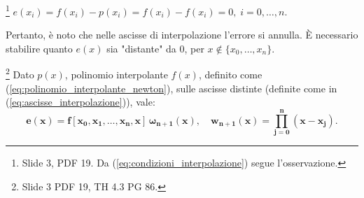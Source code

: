 \begin{remark}
    \footnote{Slide 3, PDF 19. Da (\ref{eq:condizioni_interpolazione}) segue l'osservazione.} $e(x_i)=f(x_i)-p(x_i)=f(x_i)-f(x_i)=0,\; i=0,\hdots,n.$
\end{remark}

Pertanto, è noto che nelle ascisse di interpolazione l'errore si annulla. È necessario stabilire quanto $e(x)$ sia "distante" da 0, per $x\notin \{x_0,\hdots, x_n\}.$

\begin{theorem}\label{th:errore_interpolazione_forma_newton}\footnote{Slide 3 PDF 19, TH 4.3 PG 86.} 
	Dato $p(x)$, polinomio interpolante $f(x)$, definito come (\ref{eq:polinomio_interpolante_newton}), sulle ascisse distinte (definite come in (\ref{eq:ascisse_interpolazione})), vale:
    \begin{equation}\label{eq:errore_interpolazione_forma_newton}
        \boldsymbol{e(x)=f[x_0,x_1,\hdots,x_n,x]\,\omega_{n+1}(x),\quad w_{n+1}(x)=\prod_{j=0}^{n}(x-x_j)}.
    \end{equation}
\end{theorem}

